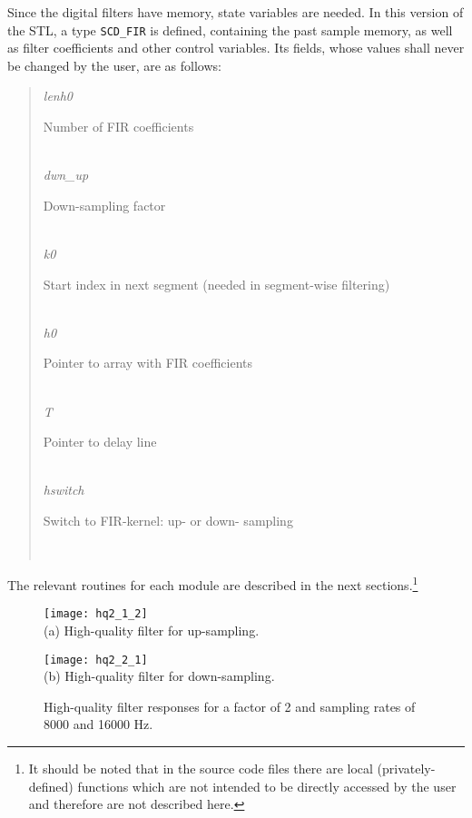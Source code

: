 Since the digital filters have memory, state variables are needed. In
this version of the STL, a type {\tt SCD\_FIR} is defined, containing the past
sample memory, as well as filter coefficients and other control
variables. Its fields, whose values shall never be changed by the
user, are as follows:
\begin{quote} \normalsize
 {\em lenh0}    \dotfill \parbox{110mm}{\SF Number of FIR coefficients}\\
 {\em dwn\_up}  \dotfill \ \parbox{110mm}{\SF Down-sampling factor }\\
 {\em k0}       \dotfill \parbox[t]{110mm}{\SF Start index in next segment
                                       (needed in segment-wise filtering) }\\
 {\em h0}       \dotfill \parbox{110mm}{\SF Pointer to array with FIR
                                          coefficients }\\
 {\em T}        \dotfill \parbox{110mm}{\SF Pointer to delay line }\\
 {\em hswitch}  \dotfill \parbox{110mm}{\SF Switch to FIR-kernel: up- or down-
                                          sampling }\\
\end{quote}

The relevant routines for each module are described in the next
sections.\footnote{\SF It should be noted that in the source code
files there are local (privately-defined) functions which are not
intended to be directly accessed by the user and therefore are not
described here.}


\begin{figure}[hbtp]
  \begin{center}
        \texttt{[image: hq2\_1\_2]}
    \\
   (a) High-quality filter for up-sampling.

        \texttt{[image: hq2\_2\_1]}
    \\
   (b) High-quality filter for down-sampling.

  \end{center}
  \caption{\SF High-quality filter responses for a
               factor of 2 and sampling rates of 8000 and
               16000 Hz.\label{hq-frq-1-2}}

\end{figure}

